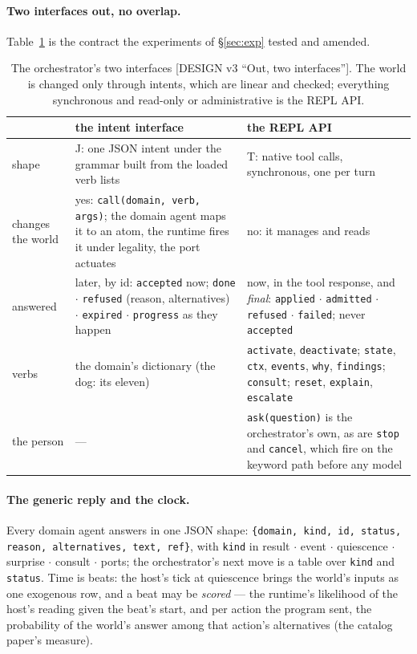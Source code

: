 \documentclass[11pt]{article}
\newcommand{\src}[1]{{\footnotesize\textsf{[#1]}}}
\begin{document}
\paragraph{Two interfaces out, no overlap.} Table~\ref{tab:ifaces} is the contract the
experiments of \S\ref{sec:exp} tested and amended.

\begin{table}[t]
\centering\small
\begin{tabular}{@{}>{\raggedright\arraybackslash}p{2.1cm}>{\raggedright\arraybackslash}p{6cm}>{\raggedright\arraybackslash}p{6cm}@{}}
\toprule
 & the intent interface & the REPL API \\
\midrule
shape & J: one JSON intent under the grammar built from the loaded verb lists & T: native tool calls, synchronous, one per turn \\
changes the world & yes: \texttt{call(domain, verb, args)}; the domain agent maps it to an atom, the runtime fires it under legality, the port actuates & no: it manages and reads \\
answered & later, by id: \texttt{accepted} now; \texttt{done} $\cdot$ \texttt{refused} (reason, alternatives) $\cdot$ \texttt{expired} $\cdot$ \texttt{progress} as they happen & now, in the tool response, and \emph{final}: \texttt{applied} $\cdot$ \texttt{admitted} $\cdot$ \texttt{refused} $\cdot$ \texttt{failed}; never \texttt{accepted} \\
verbs & the domain's dictionary (the dog: its eleven) & \texttt{activate}, \texttt{deactivate}; \texttt{state}, \texttt{ctx}, \texttt{events}, \texttt{why}, \texttt{findings}; \texttt{consult}; \texttt{reset}, \texttt{explain}, \texttt{escalate} \\
the person & --- & \texttt{ask(question)} is the orchestrator's own, as are \texttt{stop} and \texttt{cancel}, which fire on the keyword path before any model \\
\bottomrule
\end{tabular}
\caption{The orchestrator's two interfaces \src{DESIGN v3 ``Out, two interfaces''}. The
world is changed only through intents, which are linear and checked; everything synchronous
and read-only or administrative is the REPL API.}
\label{tab:ifaces}
\end{table}

\paragraph{The generic reply and the clock.} Every domain agent answers in one JSON shape:
\texttt{\{domain, kind, id, status, reason, alternatives, text, ref\}}, with \texttt{kind}
in result $\cdot$ event $\cdot$ quiescence $\cdot$ surprise $\cdot$ consult $\cdot$ ports;
the orchestrator's next move is a table over \texttt{kind} and \texttt{status}. Time is
beats: the host's tick at quiescence brings the world's inputs as one exogenous row, and
a beat may be \emph{scored} --- the runtime's likelihood of the host's reading given the
beat's start, and per action the program sent, the probability of the world's answer among
that action's alternatives (the catalog paper's measure).
\end{document}
